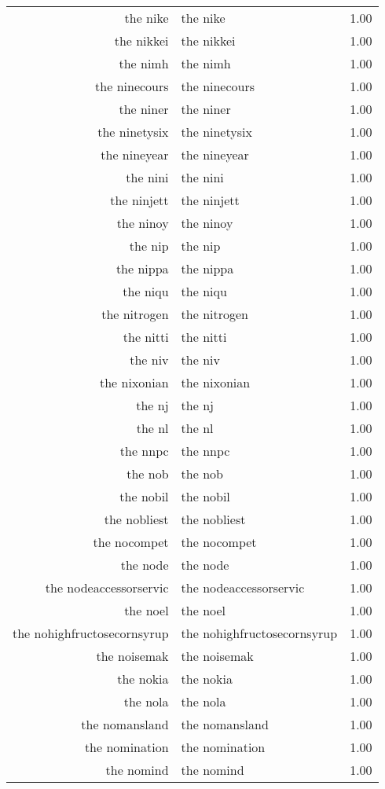 \begin{table}[ht]
\begin{tabular}{rlr}
  the nike & the nike & 1.00 \\ 
  the nikkei & the nikkei & 1.00 \\ 
  the nimh & the nimh & 1.00 \\ 
  the ninecours & the ninecours & 1.00 \\ 
  the niner & the niner & 1.00 \\ 
  the ninetysix & the ninetysix & 1.00 \\ 
  the nineyear & the nineyear & 1.00 \\ 
  the nini & the nini & 1.00 \\ 
  the ninjett & the ninjett & 1.00 \\ 
  the ninoy & the ninoy & 1.00 \\ 
  the nip & the nip & 1.00 \\ 
  the nippa & the nippa & 1.00 \\ 
  the niqu & the niqu & 1.00 \\ 
  the nitrogen & the nitrogen & 1.00 \\ 
  the nitti & the nitti & 1.00 \\ 
  the niv & the niv & 1.00 \\ 
  the nixonian & the nixonian & 1.00 \\ 
  the nj & the nj & 1.00 \\ 
  the nl & the nl & 1.00 \\ 
  the nnpc & the nnpc & 1.00 \\ 
  the nob & the nob & 1.00 \\ 
  the nobil & the nobil & 1.00 \\ 
  the nobliest & the nobliest & 1.00 \\ 
  the nocompet & the nocompet & 1.00 \\ 
  the node & the node & 1.00 \\ 
  the nodeaccessorservic & the nodeaccessorservic & 1.00 \\ 
  the noel & the noel & 1.00 \\ 
  the nohighfructosecornsyrup & the nohighfructosecornsyrup & 1.00 \\ 
  the noisemak & the noisemak & 1.00 \\ 
  the nokia & the nokia & 1.00 \\ 
  the nola & the nola & 1.00 \\ 
  the nomansland & the nomansland & 1.00 \\ 
  the nomination & the nomination & 1.00 \\ 
  the nomind & the nomind & 1.00 \\ 

\end{tabular}
\end{table}
